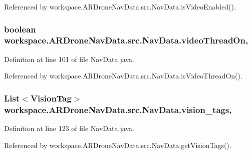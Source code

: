 Referenced by workspace.\+A\+R\+Drone\+Nav\+Data.\+src.\+Nav\+Data.\+is\+Video\+Enabled().

\hypertarget{classworkspace_1_1_a_r_drone_nav_data_1_1src_1_1_nav_data_a2f4fd94740884d71b88f5b5df47f50db}{}
\subsubsection[{video\+Thread\+On}]{\setlength{\rightskip}{0pt plus 5cm}boolean workspace.\+A\+R\+Drone\+Nav\+Data.\+src.\+Nav\+Data.\+video\+Thread\+On\hspace{0.3cm}{\ttfamily [static]}, {\ttfamily [protected]}}\label{classworkspace_1_1_a_r_drone_nav_data_1_1src_1_1_nav_data_a2f4fd94740884d71b88f5b5df47f50db}


Definition at line 101 of file Nav\+Data.\+java.



Referenced by workspace.\+A\+R\+Drone\+Nav\+Data.\+src.\+Nav\+Data.\+is\+Video\+Thread\+On().

\hypertarget{classworkspace_1_1_a_r_drone_nav_data_1_1src_1_1_nav_data_a6804548938250814a3e86f3f1a7d035a}{}
\subsubsection[{vision\+\_\+tags}]{\setlength{\rightskip}{0pt plus 5cm}List$<${\bf Vision\+Tag}$>$ workspace.\+A\+R\+Drone\+Nav\+Data.\+src.\+Nav\+Data.\+vision\+\_\+tags\hspace{0.3cm}{\ttfamily [static]}, {\ttfamily [protected]}}\label{classworkspace_1_1_a_r_drone_nav_data_1_1src_1_1_nav_data_a6804548938250814a3e86f3f1a7d035a}


Definition at line 123 of file Nav\+Data.\+java.



Referenced by workspace.\+A\+R\+Drone\+Nav\+Data.\+src.\+Nav\+Data.\+get\+Vision\+Tags().

